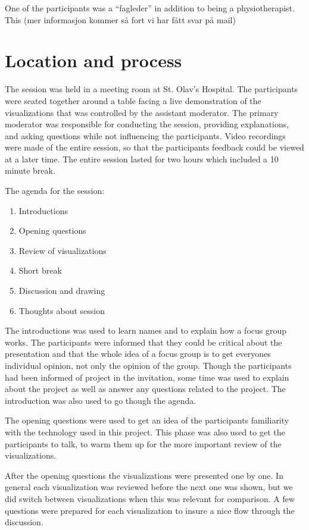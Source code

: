 One of the participants was a ``fagleder'' in addition to being a physiotherapist. This (mer informasjon kommer så fort vi har fått svar på mail)

\section{Location and process}
The session was held in a meeting room at St. Olav's Hospital. The participants were seated together around a table facing a live demonstration of the visualizations that was controlled by the assistant moderator. The primary moderator was responsible for conducting the session, providing explanations, and asking questions while not influencing the participants. Video recordings were made of the entire session, so that the participants feedback could be viewed at a later time. The entire session lasted for two hours which included a 10 minute break.

The agenda for the session:
\vspace{-8mm}
\begin{enumerate}[itemsep=0cm, parsep=0cm]
  \item Introductions
  \item Opening questions
  \item Review of visualizations
  \item Short break
  \item Discussion and drawing
  \item Thoughts about session
\end{enumerate}

The introductions was used to learn names and to explain how a focus group works. The participants were informed that they could be critical about the presentation and that the whole idea of a focus group is to get everyones individual opinion, not only the opinion of the group. Though the participants had been informed of project in the invitation, some time was used to explain about the project as well as answer any questions related to the project. The introduction was also used to go though the agenda.

The opening questions were used to get an idea of the participants familiarity with the technology used in this project. This phase was also used to get the participants to talk, to warm them up for the more important review of the visualizations.

After the opening questions the visualizations were presented one by one. In general each visualization was reviewed before the next one was shown, but we did switch between visualizations when this was relevant for comparison. A few questions were prepared for each visualization to insure a nice flow through the discussion.

